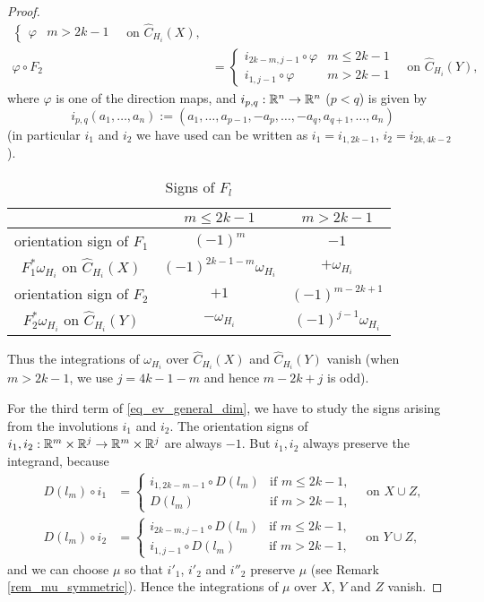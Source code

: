 \begin{proof}
\begin{align*}
\begin{cases}
   \varphi                    & m>2k-1
  \end{cases}
 \quad \text{on } \hat{C}_{H_i}(X), \\
 \varphi \circ F_2 &=
  \begin{cases}
   i_{2k-m,j-1} \circ \varphi & m\le 2k-1 \\
   i_{1,j-1}    \circ \varphi & m>2k-1
  \end{cases}
 \quad \text{on } \hat{C}_{H_i}(Y),
\end{align*}
where $\varphi$ is one of the direction maps, and $i_{p,q}:\mathbb{R}^n \to \mathbb{R}^n$ ($p<q$) is given by
\[
 i_{p,q} (a_1 ,\dots ,a_n ) :=(a_1 ,\dots ,a_{p-1},-a_p ,\dots ,-a_q , a_{q+1},\dots ,a_n )
\]
(in particular $i_1$ and $i_2$ we have used can be written as $i_1 =i_{1,2k-1}$, $i_2 =i_{2k,4k-2}$).
\begin{table}[ht]
{\begin{tabular}{|c||c|c|}\hline
                                           & $m\le 2k-1$                 & $m>2k-1$ \\
\hline\hline
orientation sign of $F_1$                  & $(-1)^m$                    & $-1$ \\
\hline
$F^*_1 \omega_{H_i}$ on $\hat{C}_{H_i}(X)$ & $(-1)^{2k-1-m}\omega_{H_i}$ & $+\omega_{H_i}$ \\
\hline
orientation sign of $F_2$                  & $+1$                        & $(-1)^{m-2k+1}$ \\
\hline
$F^*_2 \omega_{H_i}$ on $\hat{C}_{H_i}(Y)$ & $-\omega_{H_i}$             & $(-1)^{j-1}\omega_{H_i}$ \\ \hline
\end{tabular}}
\caption{Signs of $F_l$}
\label{table:signs}
\end{table}
Thus the integrations of $\omega_{H_i}$ over $\hat{C}_{H_i}(X)$ and $\hat{C}_{H_i}(Y)$ vanish (when $m>2k-1$, we use
$j=4k-1-m$ and hence $m-2k+j$ is odd).


For the third term of \eqref{eq_ev_general_dim}, we have to study the signs arising from the involutions $i_1$ and $i_2$.
The orientation signs of $i_1 ,i_2 :\mathbb{R}^m \times \mathbb{R}^j \to \mathbb{R}^m \times \mathbb{R}^j$ are always $-1$.
But $i_1,i_2$ always preserve the integrand, because
\begin{align*}
 D(l_m )\circ i_1 &=
 \begin{cases}
  i_{1,2k-m-1} \circ D(l_m ) & \text{if }m\le 2k-1, \\
  D(l_m )                    & \text{if }m>2k-1,
 \end{cases}\quad \text{on }X\cup Z, \\
 D(l_m )\circ i_2 &=
 \begin{cases}
  i_{2k-m,j-1} \circ D(l_m )  & \text{if }m\le 2k-1, \\
  i_{1,j-1} \circ D(l_m ) & \text{if }m>2k-1,
 \end{cases}\quad \text{on }Y\cup Z,
\end{align*}
and we can choose $\mu$ so that $i'_1$, $i'_2$ and $i''_2$ preserve $\mu$ (see Remark \ref{rem_mu_symmetric}).
Hence the integrations of $\mu$ over $X$, $Y$ and $Z$ vanish.
\end{proof}